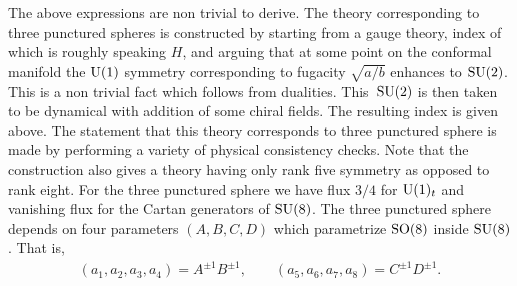 \documentclass[a4paper,12pt]{article}
\begin{document}
The above expressions are non trivial to derive. The theory corresponding to three punctured spheres is constructed by starting from a gauge theory, index of which is roughly speaking $H$, and arguing that at some point on the conformal manifold the ${\rm U}(1)$ symmetry corresponding to fugacity $\sqrt{a/b}$ enhances to ${\rm SU}(2)$. This is a non trivial fact which follows from dualities. This~${\rm SU}(2)$ is then taken to be dynamical with addition of some chiral fields. The resulting index is given above. The statement that this theory corresponds to three punctured sphere is made by performing a variety of physical consistency checks. Note that the construction also gives a theory having only rank five symmetry as opposed to rank eight.
For the three punctured sphere we have flux $3/4$ for ${\rm U}(1)_t$ and vanishing flux for the Cartan generators of ${\rm SU}(8)$. The three punctured sphere depends on four parameters $(A,B,C,D)$ which parametrize ${\rm SO}(8)$ inside ${\rm SU}(8)$. That is,
\begin{gather}
 (a_1,a_2,a_3,a_4) =A^{\pm1} B^{\pm1} ,\qquad (a_5,a_6,a_7,a_8) =C^{\pm1} D^{\pm1} .
\end{gather}
\end{document}
